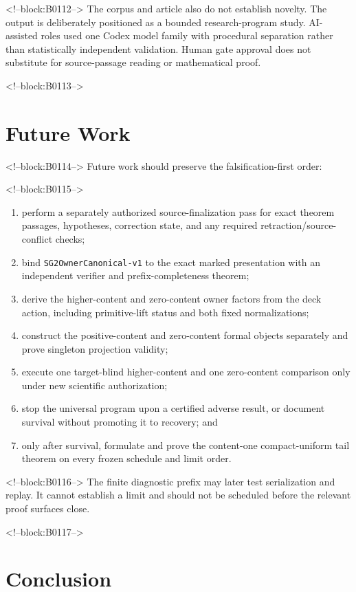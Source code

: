 \documentclass[11pt]{article}
\providecommand{\tightlist}{\setlength{\itemsep}{0pt}\setlength{\parskip}{0pt}}
\begin{document}
<!--block:B0112-->
The corpus and article also do not establish novelty. The output is
deliberately positioned as a bounded research-program study.
AI-assisted roles used one Codex model family with procedural separation
rather than statistically independent validation. Human gate approval
does not substitute for source-passage reading or mathematical proof.

<!--block:B0113-->
\hypertarget{9-future-work}{%
\section{Future Work}\label{9-future-work}}

<!--block:B0114-->
Future work should preserve the falsification-first order:

<!--block:B0115-->
\begin{enumerate}
\def\labelenumi{\arabic{enumi}.}
\tightlist
\item
  perform a separately authorized source-finalization pass for exact
  theorem passages, hypotheses, correction state, and any required
  retraction/source-conflict checks;
\item
  bind \texttt{SG2OwnerCanonical-v1} to the exact marked presentation
  with an independent verifier and prefix-completeness theorem;
\item
  derive the higher-content and zero-content owner factors from the deck
  action, including primitive-lift status and both fixed normalizations;
\item
  construct the positive-content and zero-content formal objects
  separately and prove singleton projection validity;
\item
  execute one target-blind higher-content and one zero-content
  comparison only under new scientific authorization;
\item
  stop the universal program upon a certified adverse result, or
  document survival without promoting it to recovery; and
\item
  only after survival, formulate and prove the content-one
  compact-uniform tail theorem on every frozen schedule and limit order.
\end{enumerate}

<!--block:B0116-->
The finite diagnostic prefix may later test serialization and replay. It
cannot establish a limit and should not be scheduled before the relevant
proof surfaces close.

<!--block:B0117-->
\hypertarget{10-conclusion}{%
\section{Conclusion}\label{10-conclusion}}
\end{document}
